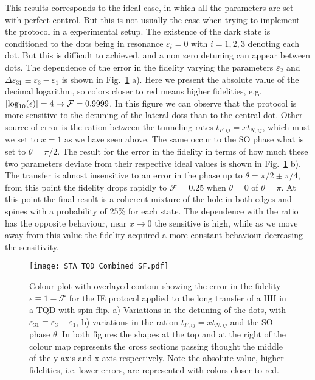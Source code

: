 This results corresponds to the ideal case, in which all the parameters are set with perfect control. But this is not usually the case when trying to implement the protocol in a experimental setup. The existence of the dark state is conditioned to the dots being in resonance $\varepsilon_i=0$ with $i=1,2,3$ denoting each dot. But this is difficult to achieved, and a non zero detuning can appear between dots. The dependence of the error in the fidelity varying the parameters $\varepsilon_{2}$ and $\Delta\varepsilon_{31}\equiv \varepsilon_3-\varepsilon_1$ is shown in Fig.~\ref{fig:STA_TQD_Combined_SF} a). Here we present the absolute value of the decimal logarithm, so colors closer to red means higher fidelities, e.g. $\abs{\log_{10}(\epsilon)}=4\rightarrow\mathcal{F}=0.9999$. In this figure we can observe that the protocol is more sensitive to the detuning of the lateral dots than to the central dot. Other source of error is the ration between the tunneling rates $t_{F,ij}=xt_{N,ij}$, which must we set to $x=1$ as we have seen above. The same occur to the SO phase what is set to $\theta=\pi/2$. The result for the error in the fidelity in terms of how much these two parameters deviate from their respective ideal values is shown in Fig.~\ref{fig:STA_TQD_Combined_SF} b). The transfer is almost insensitive to an error in the phase up to $\theta=\pi/2\pm\pi/4$, from this point the fidelity drops rapidly to $\mathcal{F}=0.25$ when $\theta=0$ of $\theta=\pi$. At this point the final result is a coherent mixture of the hole in both edges and spines with a probability of $25\%$ for each state. The dependence with the ratio has the opposite behaviour, near $x\rightarrow 0$ the sensitive is high, while as we move away from this value the fidelity acquired a more constant behaviour decreasing the sensitivity.

\begin{figure}[!htb]
	\centering
	\texttt{[image: STA\_TQD\_Combined\_SF.pdf]}
	\caption{Colour plot with overlayed contour showing the error in the fidelity $\epsilon\equiv 1-\mathcal{F}$ for the IE protocol applied to the long transfer of a HH in a TQD with spin flip. a) Variations in the detuning of the dots, with $\varepsilon_{31}\equiv \varepsilon_3-\varepsilon_1$, b) variations in the ration $t_{F,ij}=xt_{N,ij}$ and the SO phase $\theta$. In both figures the shapes at the top and at the right of the colour map represents the cross sections passing thought the middle of the y-axis and x-axis respectively. Note the absolute value, higher fidelities, i.e. lower errors, are represented with colors closer to red.}
	\label{fig:STA_TQD_Combined_SF}
\end{figure}


